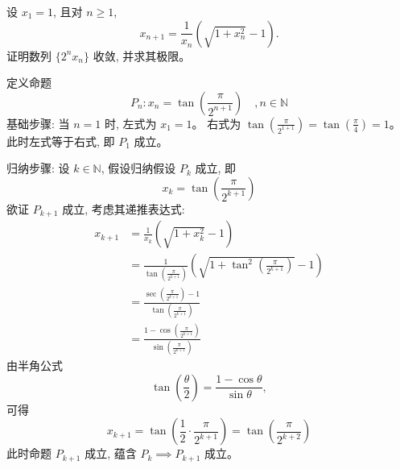 \begin{questions}

    \question 设 $x_1=1$, 且对 $n \ge 1$,
    \[
    x_{n+1}=\frac{1}{x_n}\left(\sqrt{1+x_n^2}-1\right).
    \]
    证明数列 $\{2^n x_n\}$ 收敛, 并求其极限。
    \begin{solution}
        定义命题 
        \[
        P_n: x_n = \tan\left(\frac{\pi}{2^{n+1}}\right) \quad, n \in \mathbb{N}
        \]
        基础步骤: 当 $n=1$ 时, 
        左式为 $x_1 = 1$。
        右式为 $\tan\left(\frac{\pi}{2^{1+1}}\right) = \tan\left(\frac{\pi}{4}\right) = 1$。
        此时左式等于右式, 即 $P_1$ 成立。

        归纳步骤: 设 $k \in \mathbb{N}$, 假设归纳假设 $P_k$ 成立, 即
        \[
        x_k = \tan\left(\frac{\pi}{2^{k+1}}\right)
        \]
        欲证 $P_{k+1}$ 成立, 考虑其递推表达式:
        \begin{align}
        x_{k+1} &= \frac{1}{x_k}\left(\sqrt{1+x_k^2}-1\right) \\
        &= \frac{1}{\tan\left(\frac{\pi}{2^{k+1}}\right)}\left(\sqrt{1+\tan^2\left(\frac{\pi}{2^{k+1}}\right)}-1\right) \\
        &= \frac{\sec\left(\frac{\pi}{2^{k+1}}\right)-1}{\tan\left(\frac{\pi}{2^{k+1}}\right)} \\
        &= \frac{1-\cos\left(\frac{\pi}{2^{k+1}}\right)}{\sin\left(\frac{\pi}{2^{k+1}}\right)}
        \end{align}
        由半角公式 
        \[
        \tan\left(\frac{\theta}{2}\right) = \frac{1-\cos\theta}{\sin\theta},
        \]
        可得
        \[
        x_{k+1} = \tan\left(\frac{1}{2} \cdot \frac{\pi}{2^{k+1}}\right) = \tan\left(\frac{\pi}{2^{k+2}}\right)
        \]
        此时命题 $P_{k+1}$ 成立, 蕴含 $P_k \implies P_{k+1}$ 成立。


\end{solution}
\end{questions}
